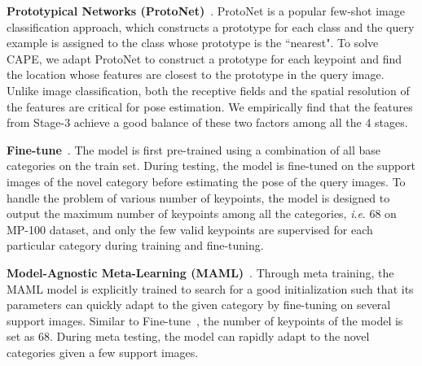 \documentclass[runningheads]{llncs}
\newcommand{\ie}{\textit{i}.\textit{e}. }
\begin{document}
{\textbf{Prototypical Networks (ProtoNet)}~\cite{snell2017prototypical}. 
ProtoNet is a popular few-shot image classification approach, which constructs a prototype for each class and the query example is assigned to the class whose prototype is the ``nearest". To solve CAPE, we adapt ProtoNet to construct a prototype for each keypoint and find the location whose features are closest to the prototype in the query image. Unlike image classification, both the receptive fields and the spatial resolution of the features are critical for pose estimation. We empirically find that the features from Stage-3 achieve a good balance of these two factors among all the 4 stages.


\textbf{Fine-tune}~\cite{nakamura2019revisiting}. 
The model is first pre-trained using a combination of all base categories on the train set. During testing, the model is fine-tuned on the support images of the novel category before estimating the pose of the query images.
To handle the problem of various number of keypoints, the model is designed to output the maximum number of keypoints among all the categories, \ie 68 on MP-100 dataset, and only the few valid keypoints are supervised for each particular category during training and fine-tuning. 


\textbf{Model-Agnostic Meta-Learning (MAML)}~\cite{finn2017model}.
Through meta training, the MAML model is explicitly trained to search for a good initialization such that its parameters can quickly adapt to the given category by fine-tuning on several support images. Similar to Fine-tune~\cite{nakamura2019revisiting}, the number of keypoints of the model is set as 68. During meta testing, the model can rapidly adapt to the novel categories given a few support images.


}
\end{document}
